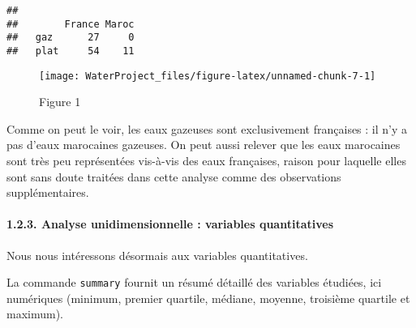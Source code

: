 \documentclass[]{article}
\newenvironment{Shaded}{\begin{snugshade}}{\end{snugshade}}
\newcommand{\KeywordTok}[1]{\textcolor[rgb]{0.13,0.29,0.53}{\textbf{#1}}}
\newcommand{\DataTypeTok}[1]{\textcolor[rgb]{0.13,0.29,0.53}{#1}}
\newcommand{\StringTok}[1]{\textcolor[rgb]{0.31,0.60,0.02}{#1}}
\newcommand{\OtherTok}[1]{\textcolor[rgb]{0.56,0.35,0.01}{#1}}
\newcommand{\OperatorTok}[1]{\textcolor[rgb]{0.81,0.36,0.00}{\textbf{#1}}}
\newcommand{\NormalTok}[1]{#1}
\let\oldparagraph\paragraph
\renewcommand{\paragraph}[1]{\oldparagraph{#1}\mbox{}}
\begin{document}
\begin{Shaded}
\end{Shaded}

\begin{verbatim}
##       
##        France Maroc
##   gaz      27     0
##   plat     54    11
\end{verbatim}

\begin{Shaded}
\end{Shaded}

\begin{figure}

{\centering \texttt{[image: WaterProject\_files/figure-latex/unnamed-chunk-7-1]} 

}

\caption{Figure 1}\label{fig:unnamed-chunk-7}
\end{figure}

 Comme on peut le voir, les eaux gazeuses sont exclusivement françaises
: il n'y a pas d'eaux marocaines gazeuses. On peut aussi relever que les
eaux marocaines sont très peu représentées vis-à-vis des eaux
françaises, raison pour laquelle elles sont sans doute traitées dans
cette analyse comme des observations supplémentaires.

\hypertarget{analyse-unidimensionnelle-variables-quantitatives}{\paragraph{1.2.3.
Analyse unidimensionnelle : variables
quantitatives}\label{analyse-unidimensionnelle-variables-quantitatives}}

Nous nous intéressons désormais aux variables quantitatives.

La commande \texttt{summary} fournit un résumé détaillé des variables
étudiées, ici numériques (minimum, premier quartile, médiane, moyenne,
troisième quartile et maximum).
\end{document}
